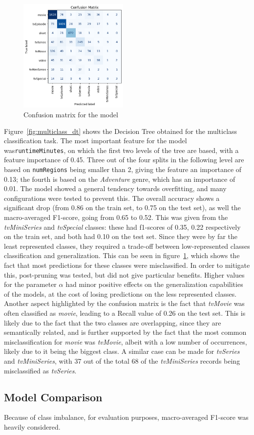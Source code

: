 \begin{figure}
    \centering
    \includegraphics[width=0.48\textwidth]{plots/multiclass_dt_conf_matrix.png}
    \caption{Confusion matrix for the model}
    \label{fig:multiclass_dt_conf_matrix}
\end{figure}
Figure~\ref{fig:multiclass_dt} shows the Decision Tree obtained for the multiclass classification task.
The most important feature for the model was\texttt{runtimeMinutes}, on which the first two levels
of the tree are based, with a feature importance of 0.45.
Three out of the four splits in the following level are based on \texttt{numRegions} being smaller than
2, giving the feature an importance of 0.13; the fourth is based on the \textit{Adventure} genre,
which has an importance of 0.01.
The model showed a general tendency towards overfitting, and many configurations were tested to prevent
this.
The overall accuracy shows a significant drop (from 0.86 on the train set, to 0.75 on the test set),
as well the macro-averaged F1-score, going from 0.65 to 0.52.
This was given from the \textit{tvMiniSeries} and \textit{tvSpecial} classes: these had f1-scores of
0.35, 0.22 respectively on the train set, and both had 0.10 on the test set. Since they were by far
the least represented classes, they required a trade-off between low-represented classes classification
and generalization. This can be seen in figure~\ref{fig:multiclass_dt_conf_matrix}, which shows the fact
that most predictions for these classes were misclassified.
In order to mitigate this, post-pruning was tested, but did not give particular benefits.
Higher values for the parameter $\alpha$ had minor positive effects on the generalization
capabilities of the models, at the cost of losing predictions on the less represented classes.
Another aspect highlighted by the confusion matrix is the fact that \textit{tvMovie} was often
classified as \textit{movie}, leading to a Recall value of 0.26 on the test set.
This is likely due to the fact that the two classes are overlapping, since they are semantically related,
and is further supported by the fact that the most common misclassification for \textit{movie} was
\textit{tvMovie}, albeit with a low number of occurrences, likely due to it being the biggest class.
A similar case can be made for \textit{tvSeries} and \textit{tvMiniSeries}, with 37 out of the total 68
of the \textit{tvMiniSeries} records being misclassified as \textit{tvSeries}.



\subsection{Model Comparison}
Because of class imbalance, for evaluation purposes,
macro-averaged F1-score was heavily considered.